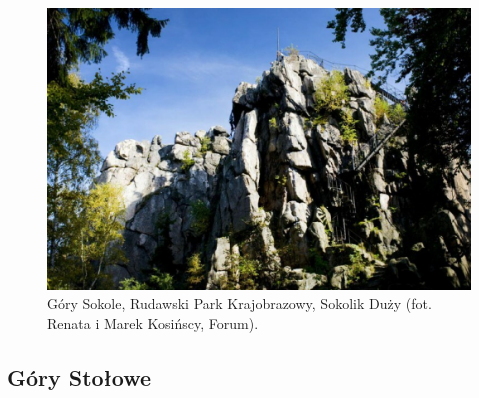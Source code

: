 \documentclass{article}
\begin{document}
\begin{figure}[!htbp]
	\begin{center}
		\includegraphics[width=0.9\linewidth]{images/sokolik-duzy.eps}
	\end{center}
	\caption{Góry Sokole, Rudawski Park Krajobrazowy, Sokolik Duży (fot. Renata i Marek Kosińscy, Forum)\cite{eng-pol-wspin}.}
	\label{}
\end{figure}

\subsection{Góry Stołowe}

\nocite{*}
\printbibliography
\end{document}
